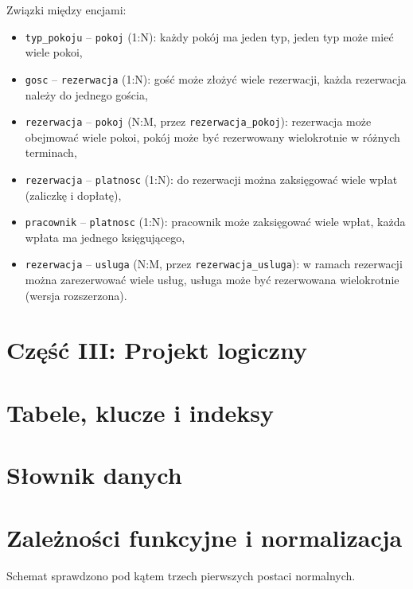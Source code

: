 \documentclass[12pt,a4paper]{article}
\newcommand{\us}{\_\allowbreak}
\begin{document}
Związki między encjami:
\begin{itemize}
    \item \texttt{typ\us pokoju} -- \texttt{pokoj} (1:N): każdy pokój ma jeden typ,
          jeden typ może mieć wiele pokoi,
    \item \texttt{gosc} -- \texttt{rezerwacja} (1:N): gość może złożyć wiele rezerwacji,
          każda rezerwacja należy do jednego gościa,
    \item \texttt{rezerwacja} -- \texttt{pokoj} (N:M, przez \texttt{rezerwacja\us pokoj}):
          rezerwacja może obejmować wiele pokoi, pokój może być rezerwowany
          wielokrotnie w różnych terminach,
    \item \texttt{rezerwacja} -- \texttt{platnosc} (1:N): do rezerwacji można
          zaksięgować wiele wpłat (zaliczkę i dopłatę),
    \item \texttt{pracownik} -- \texttt{platnosc} (1:N): pracownik może zaksięgować
          wiele wpłat, każda wpłata ma jednego księgującego,
    \item \texttt{rezerwacja} -- \texttt{usluga} (N:M, przez \texttt{rezerwacja\us usluga}):
          w ramach rezerwacji można zarezerwować wiele usług, usługa może być
          rezerwowana wielokrotnie (wersja rozszerzona).
\end{itemize}


\section*{Część III: Projekt logiczny}

\section{Tabele, klucze i indeksy}

\section{Słownik danych}

\section{Zależności funkcyjne i normalizacja}

\noindent Schemat sprawdzono pod kątem trzech pierwszych postaci normalnych.
\end{document}
